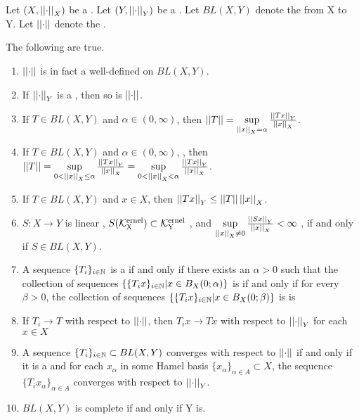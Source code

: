 \begin{prop}
\label{prop:BLO} 
Let $(X,\left|\left| \cdot \right|\right|_X)$ be a \SeminormedSpace. 
Let $(Y, \left|\left| \cdot \right|\right|_Y)$ be a \SeminormedSpace.
Let $BL(X,Y)$ denote the \SpaceOfBoundedLinearOperators from X to Y. 
Let $\left|\left| \cdot \right|\right|$ denote the \OperatorSeminorm. 

The following are true. 
\begin{enumerate}
\item $\left|\left| \cdot \right|\right|$ is in fact a well-defined \Seminorm on $BL(X,Y)$. 
\item If $\left|\left| \cdot \right|\right|_Y$ is a \Norm, then so is $\left|\left| \cdot \right|\right|$. 
\item If $T \in BL(X,Y)$ and $\alpha \in (0,\infty)$, then $\left|\left| T \right|\right| = \sup\limits_{\left|\left| x \right|\right|_X =\alpha} \frac{\left|\left| Tx \right|\right|_Y}{\left|\left| x \right|\right|_X}$. 
\item If $T \in BL(X,Y)$ and $\alpha \in (0,\infty)$, , then $\left|\left| T \right|\right| = \sup\limits_{0<\left|\left| x \right|\right|_X \leq \alpha} \frac{\left|\left| Tx \right|\right|_Y}{\left|\left| x \right|\right|_X}= \sup\limits_{0<\left|\left| x \right|\right|_X < \alpha} \frac{\left|\left| Tx \right|\right|_Y}{\left|\left| x \right|\right|_X}$. 
\item If $T \in BL(X,Y)$ and $x \in X$, then $\left|\left| Tx \right|\right|_Y \leq \left|\left| T \right|\right| \left|\left| x \right|\right|_X$. 
\item $S:X \to Y$ is linear
, $S(\bf\mathcal{K}\rm^{ernel}_X) \subset \bf\mathcal{K}\rm^{ernel}_Y$
, and $\sup\limits_{\left|\left| x \right|\right|_X \neq 0} \frac{\left|\left| Sx \right|\right|_Y}{\left|\left| x \right|\right|_X} < \infty$
, if and only if $S \in BL(X,Y)$. 
\item A sequence $\{T_i\}_{i \in \mathbb{N}}$ is a \PseudometricCauchySequence
    if and only if
    there exists an $\alpha > 0$ 
    such that the collection of sequences 
    $\{\{T_ix\}_{i \in \mathbb{N}} | x \in B_X(0;\alpha)\}$ is
    \UniformlyCauchy
    if and only if
    for every $\beta > 0$, 
    the collection of sequences 
    $\{\{T_ix\}_{i \in \mathbb{N}} | x \in B_X(0;\beta)\}$ is
    is \UniformlyCauchy
\item If $T_i \to T$ with respect to $\left|\left| \cdot \right|\right|$, then $T_ix \to Tx$ with respect to $\left|\left| \cdot \right|\right|_Y$ for each $x \in X$
\item A sequence $\{T_i\}_{i \in \mathbb{N}} \subset BL(X,Y)$ 
    converges %
    with respect to $\left|\left| \cdot \right|\right|$ 
    if and only if it is a \PseudometricCauchySequence 
    and for each $x_\alpha$ 
    in some Hamel basis $\{x_\alpha\}_{\alpha \in A} \subset X$,
    the sequence $\{T_ix_\alpha\}_{\alpha \in A}$
    converges with respect to $\left|\left| \cdot \right|\right|_Y$. 
\item $BL(X,Y)$ is complete if and only if Y is. 


\end{enumerate}
\end{prop}
